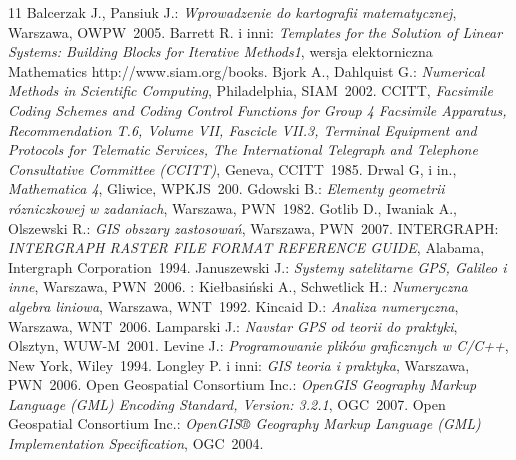 \setcounter{secnumdepth}{-1}




%
%

\begin {thebibliography}{11}
 Balcerzak J., Pansiuk J.: \emph{Wprowadzenie do kartografii matematycznej}, Warszawa, OWPW~2005.
 Barrett R. i inni: \emph{Templates for the Solution of Linear Systems: Building Blocks for Iterative Methods1}, wersja elektorniczna Mathematics http://www.siam.org/books.
 Bjork A., Dahlquist G.: \emph{Numerical Methods in Scientific Computing}, Philadelphia, SIAM~2002.
CCITT, \emph{Facsimile Coding Schemes and Coding Control Functions for Group 4 Facsimile
Apparatus, Recommendation T.6, Volume VII, Fascicle VII.3, Terminal Equipment and
Protocols for Telematic Services, The International Telegraph and Telephone Consultative Committee (CCITT)}, Geneva, CCITT~1985.
 Drwal G, i in., \emph{Mathematica 4}, Gliwice, WPKJS~200.
 Gdowski B.: \emph{Elementy geometrii rózniczkowej w zadaniach}, Warszawa, PWN~1982.
 Gotlib D., Iwaniak A., Olszewski R.: \emph{GIS obszary zastosowań}, Warszawa, PWN~2007.
 INTERGRAPH: \emph{INTERGRAPH RASTER FILE FORMAT REFERENCE GUIDE}, Alabama, Intergraph Corporation~1994.
 Januszewski J.: \emph{Systemy satelitarne GPS, Galileo i inne}, Warszawa, PWN~2006.
: Kiełbasiński A., Schwetlick H.: \emph{Numeryczna algebra liniowa}, Warszawa, WNT~1992.
 Kincaid D.: \emph{Analiza numeryczna}, Warszawa, WNT~2006.
Lamparski J.: \emph{Navstar GPS od teorii do praktyki}, Olsztyn, WUW-M~2001.
 Levine J.: \emph{Programowanie plików graficznych w C/C++}, New York, Wiley~1994.
 Longley P. i inni: \emph{GIS teoria i praktyka}, Warszawa, PWN~2006.
 Open Geospatial Consortium Inc.: \emph{OpenGIS Geography Markup Language (GML) Encoding Standard, Version: 3.2.1},  OGC~2007.
 Open Geospatial Consortium Inc.: \emph{OpenGIS® Geography Markup Language (GML) Implementation Specification}, OGC~2004.

\end{thebibliography}
